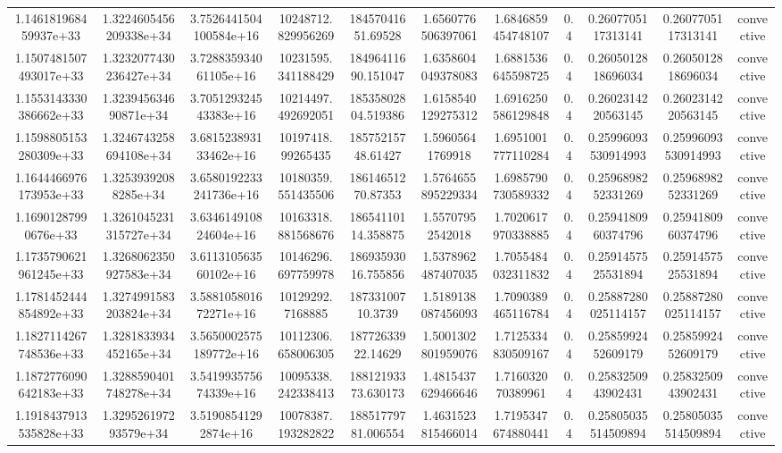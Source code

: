\begin{table}
\begin{tabular}{ccccccccccc}
1.146181968459937e+33 & 1.3224605456209338e+34 & 3.7526441504100584e+16 & 10248712.829956269 & 18457041651.69528 & 1.6560776506397061 & 1.6846859454748107 & 0.4 & 0.2607705117313141 & 0.2607705117313141 & convective \\
1.1507481507493017e+33 & 1.3232077430236427e+34 & 3.728835934061105e+16 & 10231595.341188429 & 18496411690.151047 & 1.6358604049378083 & 1.6881536645598725 & 0.4 & 0.2605012818696034 & 0.2605012818696034 & convective \\
1.1553143330386662e+33 & 1.323945634690871e+34 & 3.705129324543383e+16 & 10214497.492692051 & 18535802804.519386 & 1.6158540129275312 & 1.6916250586129848 & 0.4 & 0.2602314220563145 & 0.2602314220563145 & convective \\
1.1598805153280309e+33 & 1.3246743258694108e+34 & 3.681523893133462e+16 & 10197418.99265435 & 18575215748.61427 & 1.59605641769918 & 1.6951001777110284 & 0.4 & 0.25996093530914993 & 0.25996093530914993 & convective \\
1.1644466976173953e+33 & 1.32539392088285e+34 & 3.6580192233241736e+16 & 10180359.551435506 & 18614651270.87353 & 1.5764655895229334 & 1.6985790730589332 & 0.4 & 0.2596898252331269 & 0.2596898252331269 & convective \\
1.16901287990676e+33 & 1.3261045231315727e+34 & 3.634614910824604e+16 & 10163318.881568676 & 18654110114.358875 & 1.55707952542018 & 1.7020617970338885 & 0.4 & 0.2594180960374796 & 0.2594180960374796 & convective \\
1.1735790621961245e+33 & 1.3268062350927583e+34 & 3.611310563560102e+16 & 10146296.697759978 & 18693593016.755856 & 1.5378962487407035 & 1.7055484032311832 & 0.4 & 0.2591457525531894 & 0.2591457525531894 & convective \\
1.1781452444854892e+33 & 1.3274991583203824e+34 & 3.588105801672271e+16 & 10129292.7168885 & 18733100710.3739 & 1.5189138087456093 & 1.7090389465116784 & 0.4 & 0.25887280025114157 & 0.25887280025114157 & convective \\
1.1827114267748536e+33 & 1.3281833934452165e+34 & 3.5650002575189772e+16 & 10112306.658006305 & 18772633922.14629 & 1.5001302801959076 & 1.7125334830509167 & 0.4 & 0.2585992452609179 & 0.2585992452609179 & convective \\
1.1872776090642183e+33 & 1.3288590401748278e+34 & 3.541993575674339e+16 & 10095338.242338413 & 18812193373.630173 & 1.4815437629466646 & 1.716032070389961 & 0.4 & 0.2583250943902431 & 0.2583250943902431 & convective \\
1.1918437913535828e+33 & 1.329526197293579e+34 & 3.51908541292874e+16 & 10078387.193282822 & 18851779781.006554 & 1.4631523815466014 & 1.7195347674880441 & 0.4 & 0.25805035514509894 & 0.25805035514509894 & convective \\

\end{tabular}
\end{table}
